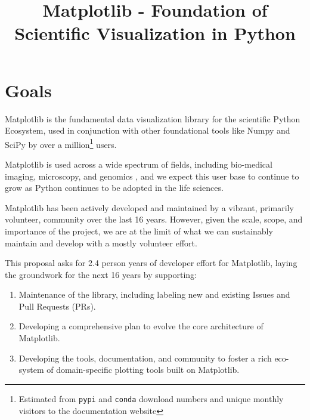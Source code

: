 \documentclass[11pt,letterpaper]{article}  %
\begin{document}
\title{Matplotlib - Foundation of Scientific Visualization in Python}
\author{}
\maketitle

\section{Goals}

Matplotlib\cite{Hunter:2007} is the fundamental
data visualization library for the scientific Python Ecosystem, used 
in conjunction with other foundational tools like Numpy and
SciPy \cite{Jones2001} by over a
million\footnote{Estimated from \texttt{pypi} and \texttt{conda} download numbers and unique monthly visitors to the documentation website} users. 

Matplotlib is used across a wide spectrum of fields, including bio-medical imaging,
microscopy, and genomics \cite{Carpenter2006,Wolf2018,10.7717/peerj.453,
  Segata2011,10.1371/journal.pgen.1000695,HASHIMSHONY2012666,
  10.1093/bioinformatics/bts480,Carlile2014,Laganowsky2014,Jiangaac9462,
  10.3389/fninf.2014.00014}, and we expect this user base to continue
to grow as Python continues to be adopted in the life sciences.

Matplotlib has been actively developed and maintained by a vibrant,
primarily volunteer, community over the last 16 years.  However, given
the scale, scope, and importance of the project, we are at the limit
of what we can sustainably maintain and develop with a mostly
volunteer effort.

This proposal asks for 2.4 person years of developer effort for
Matplotlib, laying the groundwork for the next 16 years by supporting:

\begin{enumerate}[label=\alph*),noitemsep]
  \item Maintenance of the library, including labeling new and
    existing Issues and Pull Requests (PRs).
  \item Developing a comprehensive plan to evolve the core architecture
    of Matplotlib.
  \item Developing the tools, documentation, and community to foster a
    rich eco-system of domain-specific plotting tools built on
    Matplotlib.
\end{enumerate}


\end{document}
